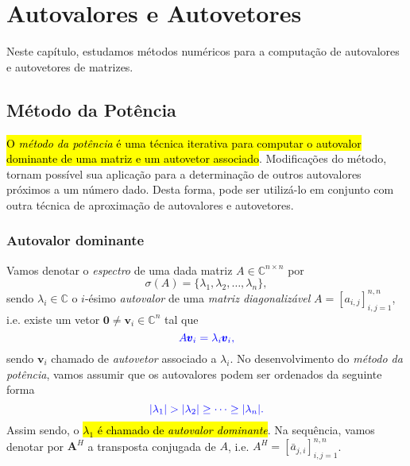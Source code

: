 \chapter{Autovalores e Autovetores}\label{cap_autoval}
\badgeRevisar

Neste capítulo, estudamos métodos numéricos para a computação de autovalores e autovetores de matrizes.

\section{Método da Potência}\label{cap_autoval_sec_pot}
\badgeRevisar

\hl{O \emph{método da potência} é uma técnica iterativa para computar o autovalor dominante de uma matriz e um autovetor associado}. Modificações do método, tornam possível sua aplicação para a determinação de outros autovalores próximos a um número dado. Desta forma, pode ser utilizá-lo em conjunto com outra técnica de aproximação de autovalores e autovetores.

\subsection{Autovalor dominante}
\badgeRevisar

Vamos denotar o \emph{espectro} de uma dada matriz $A\in\mathbb{C}^{n\times n}$ por
\begin{equation}
  \sigma(A) = \{\lambda_1, \lambda_2, \dotsc, \lambda_n\},
\end{equation}
sendo $\lambda_i\in \mathbb{C}$ o $i$-ésimo \emph{autovalor} de uma \emph{matriz diagonalizável} $A=[a_{i,j}]_{i,j=1}^{n,n}$, i.e. existe um vetor $\pmb{0}\neq \pmb{v}_i\in\mathbb{C}^n$ tal que
\begin{equation}\color{blue}A\pmb{v}_i = \lambda_i \pmb{v}_i,
\end{equation}
sendo $\pmb{v}_i$ chamado de \emph{autovetor} associado a $\lambda_i$. No desenvolvimento do \emph{método da potência}, vamos assumir que os autovalores podem ser ordenados da seguinte forma
\begin{equation}\color{blue}|\lambda_1| > |\lambda_2| \geq \cdots \geq |\lambda_n|.
\end{equation}
Assim sendo, o \hl{$\lambda_1$ é chamado de \emph{autovalor dominante}}. Na sequência, vamos denotar por $\pmb{A}^H$ a transposta conjugada de $A$, i.e. $A^H=[\bar{a}_{j,i}]_{i,j=1}^{n,n}$.

